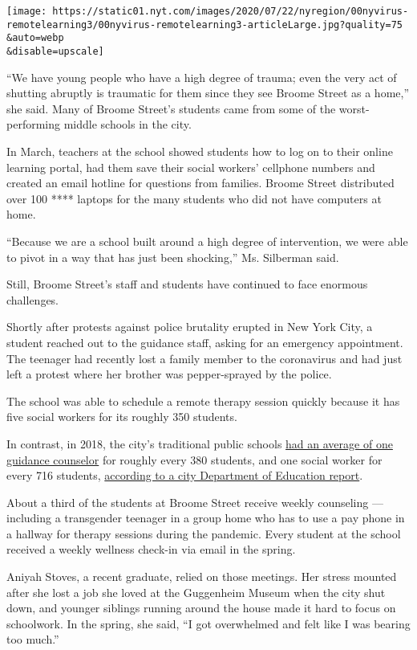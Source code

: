 \texttt{[image: https://static01.nyt.com/images/2020/07/22/nyregion/00nyvirus-remotelearning3/00nyvirus-remotelearning3-articleLarge.jpg?quality=75\\\&auto=webp\\\&disable=upscale]}

``We have young people who have a high degree of trauma; even the very
act of shutting abruptly is traumatic for them since they see Broome
Street as a home,'' she said. Many of Broome Street's students came from
some of the worst-performing middle schools in the city.

In March, teachers at the school showed students how to log on to their
online learning portal, had them save their social workers' cellphone
numbers and created an email hotline for questions from families. Broome
Street distributed over 100 **** laptops for the many students who did
not have computers at home.

``Because we are a school built around a high degree of intervention, we
were able to pivot in a way that has just been shocking,'' Ms. Silberman
said.

Still, Broome Street's staff and students have continued to face
enormous challenges.

Shortly after protests against police brutality erupted in New York
City, a student reached out to the guidance staff, asking for an
emergency appointment. The teenager had recently lost a family member to
the coronavirus and had just left a protest where her brother was
pepper-sprayed by the police.

The school was able to schedule a remote therapy session quickly because
it has five social workers for its roughly 350 students.

In contrast, in 2018, the city's traditional public schools
\href{https://www.nydailynews.com/opinion/ny-oped-the-help-nyc-schoolkids-need-20200213-pii6zdvyebhhvoladadyacb2gi-story.html}{had
an average of one guidance counselor} for roughly every 380 students,
and one social worker for every 716 students,
\href{https://infohub.nyced.org/docs/default-source/default-document-library/guidance-counselor-report-and-summary-feb-2019.pdf}{according
to a city Department of Education report}.

About a third of the students at Broome Street receive weekly counseling
--- including a transgender teenager in a group home who has to use a
pay phone in a hallway for therapy sessions during the pandemic. Every
student at the school received a weekly wellness check-in via email in
the spring.

Aniyah Stoves, a recent graduate, relied on those meetings. Her stress
mounted after she lost a job she loved at the Guggenheim Museum when the
city shut down, and younger siblings running around the house made it
hard to focus on schoolwork. In the spring, she said, ``I got
overwhelmed and felt like I was bearing too much.''

